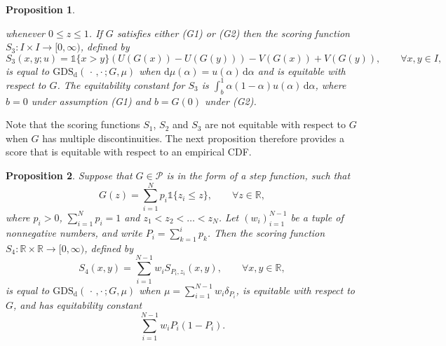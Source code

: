 \documentclass[10pt]{article} %
\theoremstyle{theorem}
\newtheorem{prop}{Proposition}
\theoremstyle{definition}
\newcommand{\RRR}{\mathbb{R}}
\newcommand{\dd}{\mathrm{d}}
\newcommand{\one}{\mathds{1}}
\newcommand{\GDSd}{\mathrm{GDS}_\mathrm{d}}
\newcommand{\twocdots}{\,\cdot\,,\cdot\,}
\begin{document}
\begin{prop}
\begin{enumerate}
whenever $0\leq z \leq 1$. If $G$ satisfies either (G1) or (G2) then the scoring function $S_3:I \times I\to[0,\infty)$, defined by
\begin{equation}
S_3(x,y;u)= \one\{x>y\}(U(G(x)) - U(G(y))) - V(G(x)) + V(G(y)), \qquad \forall x,y\in I,
\end{equation}
is equal to $\GDSd(\twocdots;G,\mu)$ when $\dd\mu(\alpha)=u(\alpha)\,\dd\alpha$ and is equitable with respect to $G$. The equitability constant for $S_3$ is $\int_b^1 \alpha(1-\alpha)u(\alpha)\,\dd\alpha$, where $b=0$ under assumption (G1) and $b=G(0)$ under (G2).
\end{enumerate}
\end{prop} 

Note that the scoring functions $S_1$, $S_2$ and $S_3$ are not equitable with respect to $G$ when $G$ has multiple discontinuities. The next proposition therefore provides a score that is equitable with respect to an empirical CDF.

\begin{prop}\label{prop:GDSd ecdf}
Suppose that $G\in\mathcal{P}$ is in the form of a step function, such that
\begin{equation}\label{eq:step func}
G(z)=\sum_{i=1}^N p_i \one\{z_i \leq z\}, \qquad\forall z\in\RRR,
\end{equation}
where $p_i>0$, $\sum_{i=1}^N p_i=1$ and $z_1<z_2<\ldots<z_N$. Let $(w_i)_{i=1}^{N-1}$ be a tuple of nonnegative numbers, and write $P_i=\sum_{k=1}^i p_k$. Then the scoring function $S_4: \RRR\times \RRR\to[0,\infty)$, defined by
\begin{equation}
S_4(x,y) = \sum_{i=1}^{N-1} w_i S_{P_i, z_i}(x,y), \qquad \forall x,y\in\RRR,
\end{equation}
is equal to $\GDSd(\twocdots;G,\mu)$ when $\mu=\sum_{i=1}^{N-1}w_i\delta_{P_i}$, is equitable with respect to $G$, and has equitability constant
\begin{equation}\label{eq:GDSc equitability constant}
\sum_{i=1}^{N-1} w_i P_i(1-P_i).
\end{equation}
\end{prop}
\end{document}
